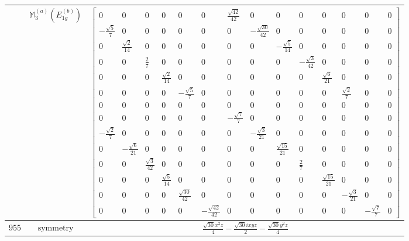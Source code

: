 \documentclass[fleqn,8pt,landscape]{jsarticle}
\begin{document}
\begin{longtable}{ccc}
$  $ & $ \mathbb{M}_{3}^{(a)}(E_{1g}^{(b)}) $ & $ \begin{bmatrix} 0 & 0 & 0 & 0 & 0 & 0 & \frac{\sqrt{42}}{42} & 0 & 0 & 0 & 0 & 0 & 0 & 0 \\ - \frac{\sqrt{5}}{7} & 0 & 0 & 0 & 0 & 0 & 0 & - \frac{\sqrt{30}}{42} & 0 & 0 & 0 & 0 & 0 & 0 \\ 0 & \frac{\sqrt{2}}{14} & 0 & 0 & 0 & 0 & 0 & 0 & - \frac{\sqrt{5}}{14} & 0 & 0 & 0 & 0 & 0 \\ 0 & 0 & \frac{2}{7} & 0 & 0 & 0 & 0 & 0 & 0 & - \frac{\sqrt{3}}{42} & 0 & 0 & 0 & 0 \\ 0 & 0 & 0 & \frac{\sqrt{2}}{14} & 0 & 0 & 0 & 0 & 0 & 0 & \frac{\sqrt{6}}{21} & 0 & 0 & 0 \\ 0 & 0 & 0 & 0 & - \frac{\sqrt{5}}{7} & 0 & 0 & 0 & 0 & 0 & 0 & \frac{\sqrt{2}}{7} & 0 & 0 \\ 0 & 0 & 0 & 0 & 0 & 0 & 0 & 0 & 0 & 0 & 0 & 0 & 0 & 0 \\ 0 & 0 & 0 & 0 & 0 & 0 & - \frac{\sqrt{7}}{7} & 0 & 0 & 0 & 0 & 0 & 0 & 0 \\ - \frac{\sqrt{2}}{7} & 0 & 0 & 0 & 0 & 0 & 0 & - \frac{\sqrt{3}}{21} & 0 & 0 & 0 & 0 & 0 & 0 \\ 0 & - \frac{\sqrt{6}}{21} & 0 & 0 & 0 & 0 & 0 & 0 & \frac{\sqrt{15}}{21} & 0 & 0 & 0 & 0 & 0 \\ 0 & 0 & \frac{\sqrt{3}}{42} & 0 & 0 & 0 & 0 & 0 & 0 & \frac{2}{7} & 0 & 0 & 0 & 0 \\ 0 & 0 & 0 & \frac{\sqrt{5}}{14} & 0 & 0 & 0 & 0 & 0 & 0 & \frac{\sqrt{15}}{21} & 0 & 0 & 0 \\ 0 & 0 & 0 & 0 & \frac{\sqrt{30}}{42} & 0 & 0 & 0 & 0 & 0 & 0 & - \frac{\sqrt{3}}{21} & 0 & 0 \\ 0 & 0 & 0 & 0 & 0 & - \frac{\sqrt{42}}{42} & 0 & 0 & 0 & 0 & 0 & 0 & - \frac{\sqrt{7}}{7} & 0 \end{bmatrix} $ \\ \hline
$ 955 $ & $ \text{symmetry} $ & $ \frac{\sqrt{30} x^{2} z}{4} - \frac{\sqrt{30} i x y z}{2} - \frac{\sqrt{30} y^{2} z}{4} $ \\

\end{longtable}
\end{document}
